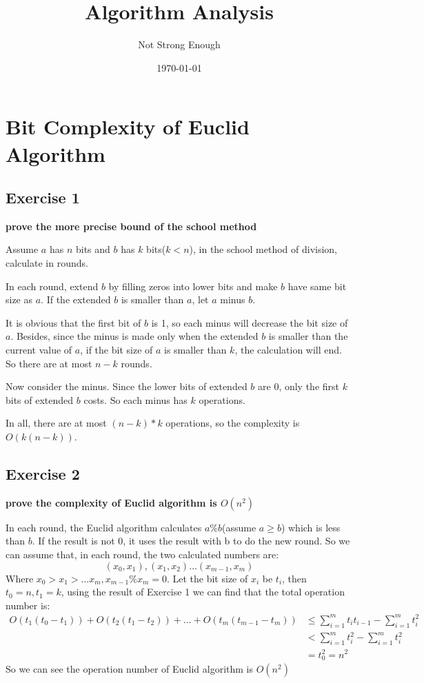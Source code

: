 \documentclass[UTF8, a4paper, linespread=1.5]{article}
\title{Algorithm Analysis}
\date{\today}
\author{Not Strong Enough}
\begin{document}
\maketitle

\section{Bit Complexity of Euclid Algorithm}

\subsection{Exercise 1}

{\bfseries prove the more precise bound of the school method}

Assume $a$ has $n$ bits and $b$ has $k$ bits($k < n$), in the school method of division, 
calculate in rounds. 

In each round, extend $b$ by filling zeros into lower bits and make $b$ have same bit size as $a$. 
If the extended $b$ is smaller than $a$, let $a$ minus $b$. 

It is obvious that the first bit of $b$ is 1, so each minus will decrease the bit size of $a$. 
Besides, since the minus is made only when the extended $b$ is smaller than the current value of $a$, 
if the bit size of $a$ is smaller than $k$, the calculation will end. 
So there are at most $n-k$ rounds. 

Now consider the minus. Since the lower bits of extended $b$ are 0, only the first $k$ bits of extended $b$ 
costs. So each minus has $k$ operations. 

In all, there are at most $(n-k)*k$ operations, so the complexity is $O(k(n-k))$. 

\subsection{Exercise 2}

{\bfseries prove the complexity of Euclid algorithm is $O(n^2)$}

In each round, the Euclid algorithm calculates $a\%b$(assume $a\geq b$) which is less than $b$. 
If the result is not 0, it uses the result with b to do the new round. So we can assume that, in each round, 
the two calculated numbers are: 
$$(x_0, x_1), (x_1, x_2)\dots (x_{m-1}, x_m)$$
Where $x_0>x_1>\dots x_m, x_{m-1}\%x_m=0$. 
Let the bit size of $x_i$ be $t_i$, then $t_0=n, t_1=k$, 
using the result of Exercise 1 we can find that the total operation number is: 
\begin{align}
O(t_1(t_0-t_1))+O(t_2(t_1-t_2))+\dots + O(t_m(t_{m-1}-t_m)) &\leq\sum_{i=1}^m t_i t_{i-1}-\sum_{i=1}^m t_i^2\\
&<\sum_{i=1}^m t_i^2 -\sum_{i=1}^m t_i^2\\
&=t_0^2=n^2
\end{align}
So we can see the operation number of Euclid algorithm is $O(n^2)$
\end{document}
